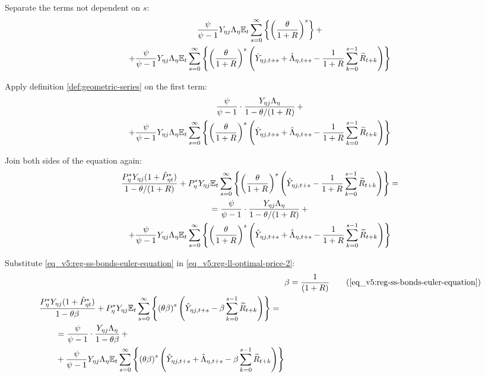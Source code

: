 \documentclass[../thesis.tex]{subfiles}
\begin{document}
Separate the terms not dependent on $s$:
\begin{multline}
	\frac{\psi}{\psi-1} Y_{\eta j} \Lambda_{\eta} {\mathbb{E}_{t}} \sum_{s=0}^{\infty} \left\{ \left( \frac{\theta}{1 + R} \right)^s \right\} + 
	\\
	+ \frac{\psi}{\psi-1} Y_{\eta j} \Lambda_{\eta} {\mathbb{E}_{t}} \sum_{s=0}^{\infty} \left\{ \left( \frac{\theta}{1 + R} \right)^s \left( \hat{Y}_{\eta j, t+s} + \hat{\Lambda}_{\eta, t+s} - \frac{1}{1 + R} \sum_{k=0}^{s-1} \widetilde{R}_{t+k} \right) \right\} \nonumber
\end{multline}

Apply definition \ref{def:geometric-series} on the first term:
\begin{multline}
	\frac{\psi}{\psi-1} \cdot \frac{Y_{\eta j} \Lambda_{\eta}}{1-\theta /(1+R)} \, + 
	\\
	+ \frac{\psi}{\psi-1} Y_{\eta j} \Lambda_{\eta} {\mathbb{E}_{t}} \sum_{s=0}^{\infty} \left\{ \left( \frac{\theta}{1 + R} \right)^s \left( \hat{Y}_{\eta j, t+s} + \hat{\Lambda}_{\eta, t+s} - \frac{1}{1 + R} \sum_{k=0}^{s-1} \widetilde{R}_{t+k} \right) \right\} \nonumber
\end{multline}

Join both sides of the equation again:
\begin{multline}
	\frac{ P_{\eta}^{\ast} Y_{\eta j} ( 1 + \hat{P}_{\eta t}^{\ast} )}{1-\theta /(1+R)} + P_{\eta}^{\ast} Y_{\eta j} {\mathbb{E}_{t}} \sum_{s=0}^{\infty} \left\{ \left( \frac{\theta}{1 + R} \right)^s \left( \hat{Y}_{\eta j, t+s} - \frac{1}{1 + R} \sum_{k=0}^{s-1} \widetilde{R}_{t+k} \right) \right\} = 
	\\
	= \frac{\psi}{\psi-1} \cdot \frac{Y_{\eta j} \Lambda_{\eta}}{1-\theta /(1+R)} \, + 
	\\
	+ \frac{\psi}{\psi-1} Y_{\eta j} \Lambda_{\eta} {\mathbb{E}_{t}} \sum_{s=0}^{\infty} \left\{ \left( \frac{\theta}{1 + R} \right)^s \left( \hat{Y}_{\eta j, t+s} + \hat{\Lambda}_{\eta, t+s} - \frac{1}{1 + R} \sum_{k=0}^{s-1} \widetilde{R}_{t+k} \right) \right\} \label{eq_v5:reg-ll-optimal-price-2}
\end{multline}

Substitute \ref{eq_v5:reg-ss-bonds-euler-equation} in \ref{eq_v5:reg-ll-optimal-price-2}:
\begin{align}
	& \beta = \frac{1}{(1 + R)} \tag{\ref{eq_v5:reg-ss-bonds-euler-equation}} \\
	\begin{split} & \frac{ P_{\eta}^{\ast} Y_{\eta j} ( 1 + \hat{P}_{\eta t}^{\ast} )}{1- \theta \beta} + P_{\eta}^{\ast} Y_{\eta j} \E \sum_{s=0}^{\infty} \left\{ \left( \theta \beta \right)^s \left( \hat{Y}_{\eta j, t+s} - \beta \sum_{k=0}^{s-1} \widetilde{R}_{t+k} \right) \right\} = \\ & \qquad = \frac{\psi}{\psi-1} \cdot \frac{Y_{\eta j} \Lambda_{\eta}}{1- \theta \beta} \, + \\ & \qquad + \frac{\psi}{\psi-1} Y_{\eta j} \Lambda_{\eta} \E \sum_{s=0}^{\infty} \left\{ \left( \theta \beta \right)^s \left( \hat{Y}_{\eta j, t+s} + \hat{\Lambda}_{\eta, t+s} - \beta \sum_{k=0}^{s-1} \widetilde{R}_{t+k} \right) \right\} \end{split} \label{eq_v5:reg-ll-optimal-price-3}
\end{align}
\end{document}
